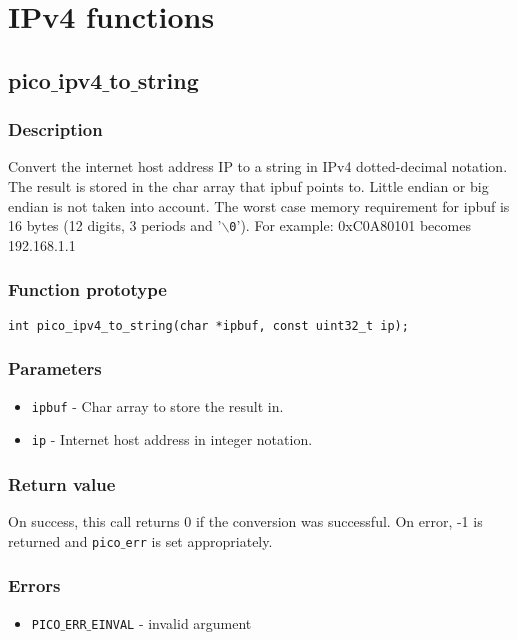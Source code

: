 \section{IPv4 functions}


\subsection{pico$\_$ipv4$\_$to$\_$string}

\subsubsection*{Description}
Convert the internet host address IP to a string in IPv4 dotted-decimal notation.
The result is stored in the char array that ipbuf points to. Little
endian or big endian is not taken into account. The worst case memory requirement for
ipbuf is 16 bytes (12 digits, 3 periods and '\texttt{$\backslash$0}').
For example: 0xC0A80101 becomes 192.168.1.1

\subsubsection*{Function prototype}
\begin{verbatim}
int pico_ipv4_to_string(char *ipbuf, const uint32_t ip);
\end{verbatim}

\subsubsection*{Parameters}
\begin{itemize}[noitemsep]
\item \texttt{ipbuf} - Char array to store the result in.
\item \texttt{ip} - Internet host address in integer notation.
\end{itemize}

\subsubsection*{Return value}
On success, this call returns 0 if the conversion was successful.
On error, -1 is returned and \texttt{pico$\_$err} is set appropriately.

\subsubsection*{Errors}
\begin{itemize}[noitemsep]
\item \texttt{PICO$\_$ERR$\_$EINVAL} - invalid argument
\end{itemize}

